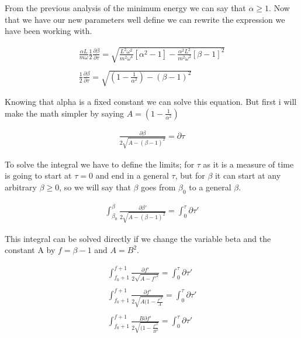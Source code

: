 From the previous analysis of the minimum energy we can say that $\alpha \geq 1$. Now that we have our new parameters well define we can rewrite the expression we have been working with.

\begin{equation}
  \begin{array}{c}
    \frac{\alpha L}{m\omega}\frac{1}{2} \frac{\partial \beta}{\partial \tau} = \sqrt{\frac{L^2\omega^2}{m^2\omega^4}[\alpha^2-1]-\frac{\alpha^2 L^2}{m^2\omega^2}[\beta-1]^2}
    \\

    \\
    \frac{1}{2} \frac{\partial \beta}{\partial \tau} = \sqrt{\left(1-\frac{1}{\alpha^2}\right)-(\beta-1)^2}
  \end{array}
\end{equation}

Knowing that alpha is a fixed constant we can solve this equation. But first i will make the math simpler by saying $A = \left(1-\frac{1}{\alpha^2}\right)$

\begin{equation}
  \begin{array}{c}
    \frac{\partial \beta}{2\sqrt{A-(\beta-1)^2}} = \partial\tau
  \end{array}
\end{equation}

To solve the integral we have to define the limits; for $\tau$ as it is a measure of time is going to start at $\tau=0$ and end in a general $\tau$, but for $\beta$ it can start at any arbitrary $\beta \geq 0$, so we will say that $\beta$ goes from $\beta_0$ to a general $\beta$.

\begin{equation}
  \begin{array}{c}
    \int_{\beta_0}^{\beta}\frac{\partial \beta'}{2\sqrt{A-(\beta-1)^2}} = \int_{0}^{\tau}\partial\tau'
  \end{array}
\end{equation}

This integral can be solved directly if we change the variable beta and the constant A by $f = \beta-1$ and $A = B^2$.

\begin{equation}
  \begin{array}{c}
    \int_{f_0+1}^{f+1}\frac{\partial f'}{2\sqrt{A-f'^2}} = \int_{0}^{\tau}\partial\tau'
    \\

    \\
    \int_{f_0+1}^{f+1}\frac{\partial f'}{2\sqrt{A(1-\frac{f'^2}{A}}} = \int_{0}^{\tau}\partial\tau'
    \\

    \\
    \int_{f_0+1}^{f+1}\frac{B \partial f'}{2\sqrt{(1-\frac{f'^2}{B^2}}} = \int_{0}^{\tau}\partial\tau'
  \end{array}
\end{equation}

